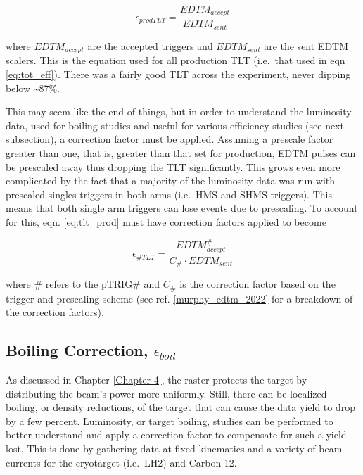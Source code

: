 \documentclass[
]{report}
\begin{document}
\begin{equation} 
  \epsilon_{prodTLT}=\frac{EDTM_{accept}}{EDTM_{sent}}
  \label{eq:tlt_prod} 
\end{equation}

\noindent where \(EDTM_{accept}\) are the accepted triggers and
\(EDTM_{sent}\) are the sent EDTM scalers. This is the equation used for
all production TLT (i.e.~that used in eqn \ref{eq:tot_eff}). There was a
fairly good TLT across the experiment, never dipping below
\textasciitilde87\%.



This may seem like the end of things, but in order to understand the
luminosity data, used for boiling studies and useful for various
efficiency studies (see next subsection), a correction factor must be
applied. Assuming a prescale factor greater than one, that is, greater
than that set for production, EDTM pulses can be prescaled away thus
dropping the TLT significantly. This grows even more complicated by the
fact that a majority of the luminosity data was run with prescaled
singles triggers in both arms (i.e.~HMS and SHMS triggers). This means
that both single arm triggers can lose events due to prescaling. To
account for this, eqn. \ref{eq:tlt_prod} must have correction factors
applied to become

\begin{equation} 
  \epsilon_{\#TLT}=\frac{EDTM^{\#}_{accept}}{C_{\#}\cdot EDTM_{sent}}
  \label{eq:tlt_prescale} 
\end{equation}

\noindent where \# refers to the pTRIG\# and \(C_{\#}\) is the
correction factor based on the trigger and prescaling scheme (see ref.
\ref{murphy_edtm_2022} for a breakdown of the correction factors).

\hypertarget{boiling-correction-epsilon_boil}{%
\subsection{\texorpdfstring{Boiling Correction,
\(\epsilon_{boil}\)}{Boiling Correction, \textbackslash epsilon\_\{boil\}}}\label{boiling-correction-epsilon_boil}}

As discussed in Chapter \ref{Chapter-4}, the raster protects the target
by distributing the beam's power more uniformly. Still, there can be
localized boiling, or density reductions, of the target that can cause
the data yield to drop by a few percent. Luminosity, or target boiling,
studies can be performed to better understand and apply a correction
factor to compensate for such a yield lost. This is done by gathering
data at fixed kinematics and a variety of beam currents for the
cryotarget (i.e.~LH2) and Carbon-12.
\end{document}
